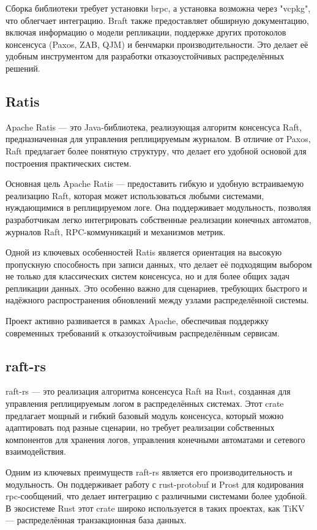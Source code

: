 Сборка библиотеки требует установки brpc, а установка возможна через "vcpkg", что
облегчает интеграцию. Braft также предоставляет обширную документацию, включая
информацию о модели репликации, поддержке других протоколов консенсуса (Paxos, ZAB, QJM)
и бенчмарки производительности. Это делает её удобным инструментом для разработки
отказоустойчивых распределённых решений.

\subsection{Ratis}

Apache Ratis — это Java-библиотека, реализующая алгоритм консенсуса Raft,
предназначенная для управления реплицируемым журналом. В отличие от Paxos, Raft
предлагает более понятную структуру, что делает его удобной основой для построения
практических систем.  

Основная цель Apache Ratis — предоставить гибкую и удобную встраиваемую реализацию Raft,
которая может использоваться любыми системами, нуждающимися в реплицируемом логе.
Она поддерживает модульность, позволяя разработчикам легко интегрировать собственные
реализации конечных автоматов, журналов Raft, RPC-коммуникаций и механизмов метрик.  

Одной из ключевых особенностей Ratis является ориентация на высокую пропускную
способность при записи данных, что делает её подходящим выбором не только для
классических систем консенсуса, но и для более общих задач репликации данных.
Это особенно важно для сценариев, требующих быстрого и надёжного распространения
обновлений между узлами распределённой системы.  

Проект активно развивается в рамках Apache, обеспечивая поддержку современных требований
к отказоустойчивым распределённым сервисам.

\subsection{raft-rs}

raft-rs — это реализация алгоритма консенсуса Raft на Rust, созданная для управления
реплицируемым логом в распределённых системах. Этот crate предлагает мощный и гибкий
базовый модуль консенсуса, который можно адаптировать под разные сценарии, но требует
реализации собственных компонентов для хранения логов, управления конечными автоматами
и сетевого взаимодействия.

Одним из ключевых преимуществ raft-rs является его производительность и модульность.
Он поддерживает работу с rust-protobuf и Prost для кодирования rpc-сообщений, что
делает интеграцию с различными системами более удобной. В экосистеме Rust этот crate
широко используется в таких проектах, как TiKV — распределённая транзакционная база
данных.

